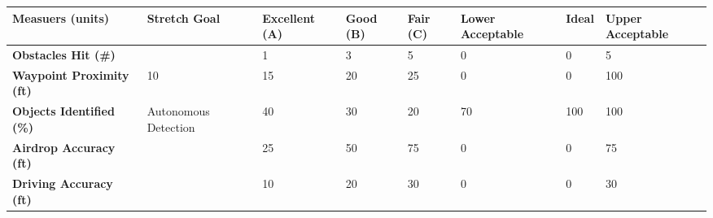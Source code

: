\begin{table}[H]
	\centering
\begin{tabular}{|p{4.2cm}|p{2.1cm}|p{1.7cm}|p{1cm}|p{1cm}|p{1.7cm}|p{1cm}|p{1.7cm}|}
	\hline
	\textbf{Measuers (units)} & \textbf{Stretch Goal} & \textbf{Excellent (A)} & \textbf{Good (B)} & \textbf{Fair (C)} & \textbf{Lower Acceptable} & \textbf{Ideal} & \textbf{Upper Acceptable} \\
	\hline
	\textbf{Obstacles Hit (\#)} & & 1 & 3 & 5 & 0 & 0 & 5 \\
	\hline
	\textbf{Waypoint Proximity (ft)} & 10 & 15 & 20 & 25 & 0 & 0 & 100 \\
	\hline
	\textbf{Objects Identified (\%)} & Autonomous Detection & 40 & 30 & 20 & 70 & 100 & 100 \\
	\hline
	\textbf{Airdrop Accuracy (ft)} & & 25 & 50 & 75 & 0 & 0 & 75 \\
	\hline
	\textbf{Driving Accuracy (ft)} & & 10 & 20 & 30 & 0 & 0 & 30 \\
	\hline
\end{tabular}
\end{table}

